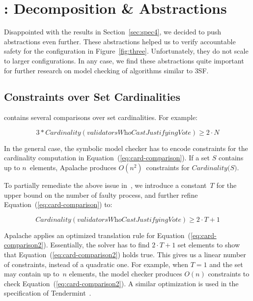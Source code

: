 
\section{\SpecFourB{}: Decomposition \& Abstractions}\label{sec:spec4b}

Disappointed with the results in Section~\ref{sec:spec4}, we decided to
push abstractions even further. These abstractions helped us to verify
accountable safety for the configuration in Figure~\ref{fig:three}.
Unfortunately, they do not scale to larger configurations. In any case, we
find these abstractions quite important for further research on model checking
of algorithms similar to 3SF\@.

\subsection{Constraints over Set Cardinalities}

\SpecThree{} contains several comparisons over set cardinalities. For example:

\begin{equation}
    3 * \textit{Cardinality}(\textit{validatorsWhoCastJustifyingVote}) \ge 2 \cdot N
    \label{eq:card-comparison}
\end{equation}

In the general case, the symbolic model checker has to encode constraints for
the cardinality computation in Equation~(\ref{eq:card-comparison}). If a set
$S$ contains up to $n$~elements, Apalache produces $O(n^2)$~constraints for
$\textit{Cardinality(S)}$.

To partially remediate the above issue in~\SpecFour{}, we introduce a
constant~$T$ for the upper bound on the number of faulty process, and further
refine Equation~(\ref{eq:card-comparison}) to:

\begin{equation}
    \textit{Cardinality}(\textit{validatorsWhoCastJustifyingVote}) \ge 2 \cdot T + 1
    \label{eq:card-comparison2}
\end{equation}

Apalache applies an optimized translation rule for
Equation~(\ref{eq:card-comparison2}). Essentially, the solver has to find $2
\cdot T + 1$ set elements to show that Equation~(\ref{eq:card-comparison2})
holds true. This gives us a linear number of constraints, instead of a
quadratic one. For example, when $T=1$ and the set may contain up to~$n$
elements, the model checker produces $O(n)$ constraints to check
Equation~(\ref{eq:card-comparison2}). A similar optimization is used in the
specification of Tendermint~\cite{TendermintSpec2020}.

